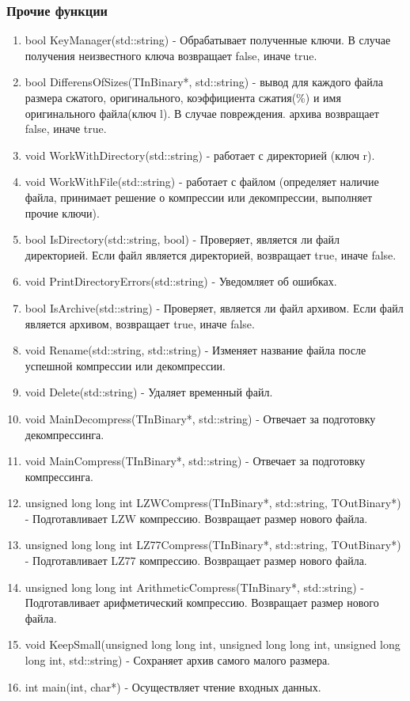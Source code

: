\documentclass[12pt]{article}
\begin{document}
\subsubsection*{Прочие функции}
\noindent
\begin{enumerate}
	\item bool KeyManager(std::string) - Обрабатывает полученные ключи. В случае получения неизвестного ключа возвращает false, иначе true.
	\item bool DifferensOfSizes(TInBinary*, std::string) - вывод для каждого файла размера сжатого, оригинального, коэффициента сжатия(\%) и имя оригинального файла(ключ l). В случае повреждения. архива возвращает false, иначе true.
	\item void WorkWithDirectory(std::string) - работает с директорией (ключ r).
	\item void WorkWithFile(std::string) - работает с файлом (определяет наличие файла, принимает решение о компрессии или декомпрессии, выполняет прочие ключи).
	\item bool IsDirectory(std::string, bool) - Проверяет, является ли файл директорией. Если файл является директорией, возвращает true, иначе false.
	\item void PrintDirectoryErrors(std::string) - Уведомляет об ошибках.
	\item bool IsArchive(std::string) - Проверяет, является ли файл архивом. Если файл является архивом, возвращает true, иначе false.
	\item void Rename(std::string, std::string) - Изменяет название файла после успешной компрессии или декомпрессии.
	\item void Delete(std::string) - Удаляет временный файл.
	\item void MainDecompress(TInBinary*, std::string) - Отвечает за подготовку декомпрессинга.
	\item void MainCompress(TInBinary*, std::string) - Отвечает за подготовку компрессинга.
	\item unsigned long long int LZWCompress(TInBinary*, std::string, TOutBinary*) - Подготавливает LZW компрессию. Возвращает размер нового файла.
	\item unsigned long long int LZ77Compress(TInBinary*, std::string, TOutBinary*) - Подготавливает LZ77 компрессию. Возвращает размер нового файла.
	\item unsigned long long int ArithmeticCompress(TInBinary*, std::string) - Подготавливает арифметический компрессию. Возвращает размер нового файла.
	\item void KeepSmall(unsigned long long int, unsigned long long int,
	unsigned long long int, std::string) - Сохраняет архив самого малого размера.
	\item int main(int, char*) - Осуществляет чтение входных данных.
\end{enumerate}
\end{document}
